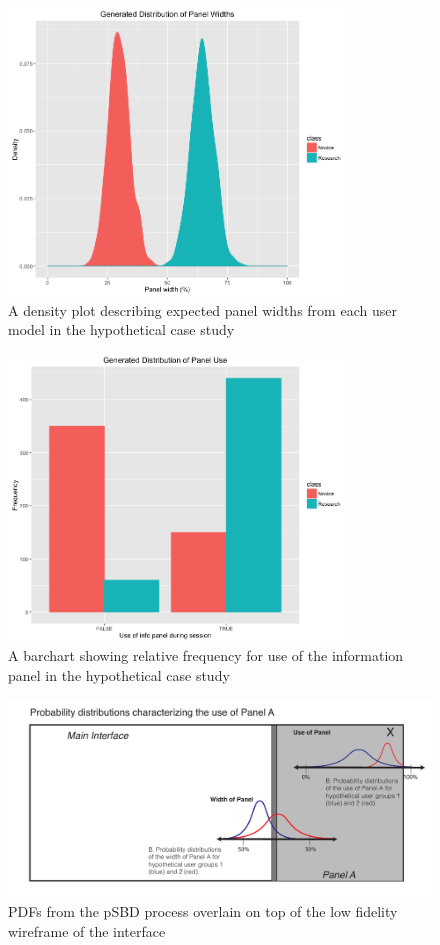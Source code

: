 \documentclass[]{article}
\begin{document}
\begin{figure}[htbp]
\centering
\includegraphics[height=3.00000in]{./densities.png}
\caption{A density plot describing expected panel widths from each user
model in the hypothetical case study\label{densities}}
\end{figure}

\begin{figure}[htbp]
\centering
\includegraphics[height=3.00000in]{./barchart.png}
\caption{A barchart showing relative frequency for use of the
information panel in the hypothetical case study \label{densities}}
\end{figure}

\begin{figure}[htbp]
\centering
\includegraphics{./fig2_a.pdf}
\caption{PDFs from the pSBD process overlain on top of the low fidelity
wireframe of the interface \label{wireframe_pdf}}
\end{figure}
\end{document}
